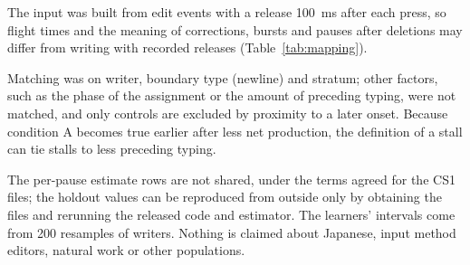 The input was built from edit events with a release 100~ms after each press, so flight times and the meaning of
corrections, bursts and pauses after deletions may differ from writing with recorded releases
(Table~\ref{tab:mapping}).

Matching was on writer, boundary type (newline) and stratum; other factors, such as the phase of the assignment or the amount of
preceding typing, were not matched, and only controls are excluded by proximity to a later onset. Because condition A
becomes true earlier after less net production, the definition of a stall can tie stalls to less preceding typing.

The per-pause estimate rows are not shared, under the terms agreed for the CS1 files; the holdout values can be
reproduced from outside only by obtaining the files and rerunning the released code and estimator. The learners'
intervals come from 200 resamples of writers. Nothing is claimed about Japanese, input method editors, natural work or other populations.

